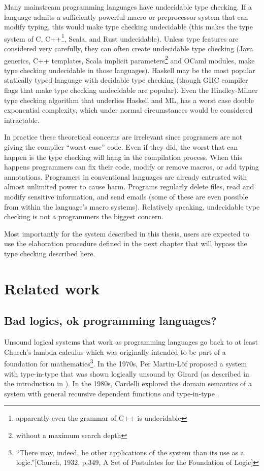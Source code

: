 Many mainstream programming languages have undecidable type checking.
If a language admits a sufficiently powerful macro or preprocessor system that can modify typing, this would make type checking undecidable (this makes the type system of C, C++\footnote{apparently even the grammar of C++ is undecidable}, Scala, and Rust undecidable).
Unless type features are considered very carefully, they can often create undecidable type checking (Java generics, C++ templates, Scala implicit parameters\footnote{without a maximum search depth} and OCaml modules, make type checking undecidable in those languages).
Haskell may be the most popular statically typed language with decidable type checking (though GHC compiler flags that make type checking undecidable are popular).
Even the Hindley-Milner type checking algorithm that underlies Haskell and ML, has a worst case double exponential complexity, which under normal circumstances would be considered intractable.

In practice these theoretical concerns are irrelevant since programers are not giving the compiler ``worst case'' code.
Even if they did, the worst that can happen is the type checking will hang in the compilation process.
When this happens programmers can fix their code, modify or remove macros, or add typing annotations.
Programers in conventional languages are already entrusted with almost unlimited power to cause harm.
Programs regularly delete files, read and modify sensitive information, and send emails (some of these are even possible from within the language's macro systems).
Relatively speaking, undecidable type checking is not a programmers the biggest concern.

Most importantly for the system described in this thesis, users are expected to use the elaboration procedure defined in the next chapter that will bypass the type checking described here.

\section{Related work}

\subsection{Bad logics, ok programming languages?}

Unsound logical systems that work as programming languages go back to at least Church's lambda calculus which was originally intended to be part of a foundation for mathematics\footnote{``There may, indeed, be other applications of the system than its use as a logic.''{[}Church, 1932, p.349, A Set of Postulates for the Foundation of Logic{]}}.
In the 1970s, Per Martin-L{\"o}f proposed a system with type-in-type that was shown logically unsound by Girard (as described in the introduction in \cite{Martin-Lof-1972}).
In the 1980s, Cardelli explored the domain semantics of a system with general recursive dependent functions and type-in-type \cite{cardelli1986polymorphic}.


